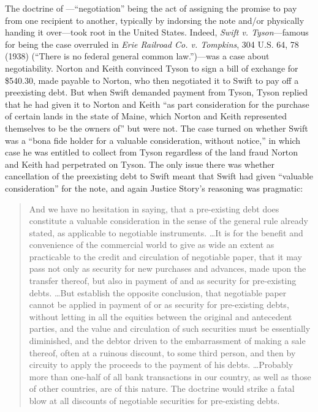 The doctrine of ---``negotiation'' being the act of
assigning the
promise to pay from one recipient to another, typically by indorsing the note
and/or physically handing it over---took root in the United States. Indeed,
\textit{Swift v. Tyson}---famous for being the case overruled in \textit{Erie
Railroad Co. v. Tompkins}, 304 U.S. 64, 78 (1938) (``There is no federal
general common law.'')---was a case about negotiability. Norton and Keith
convinced Tyson to sign a bill of exchange for \$540.30, made payable to
Norton, who then negotiated it to Swift to pay off a preexisting debt. But when
Swift demanded payment from Tyson, Tyson replied that he had given it to Norton
and Keith ``as part consideration for the purchase of certain lands in the
state of Maine, which Norton and Keith represented themselves to be the owners
of'' but were not. The case turned on whether Swift was a ``bona fide holder
for a valuable consideration, without notice,'' in which case he was entitled
to collect from Tyson regardless of the land fraud Norton and Keith had
perpetrated on Tyson. The only issue there was whether cancellation of the
preexisting debt to Swift meant that Swift had given ``valuable consideration''
for the note, and again Justice Story's reasoning was pragmatic:
\begin{quote}
And we have no hesitation in saying, that a pre-existing debt does constitute a
valuable consideration in the sense of the general rule already stated, as
applicable to negotiable instruments. \ldots It is for the benefit and
convenience of the commercial world to give as wide an extent as practicable to
the credit and circulation of negotiable paper, that it may pass not only as
security for new purchases and advances, made upon the transfer thereof, but
also in payment of and as security for pre-existing debts. \ldots But
establish the opposite conclusion, that negotiable paper cannot be applied in
payment of or as security for pre-existing debts, without letting in all the
equities between the original and antecedent parties, and the value and
circulation of such securities must be essentially diminished, and the debtor
driven to the embarrassment of making a sale thereof, often at a ruinous
discount, to some third person, and then by circuity to apply the proceeds to
the payment of his debts. \ldots Probably more than one-half of all bank
transactions in our country, as well as those of other countries, are of this
nature. The doctrine would strike a fatal blow at all discounts of negotiable
securities for pre-existing debts.
\end{quote}
